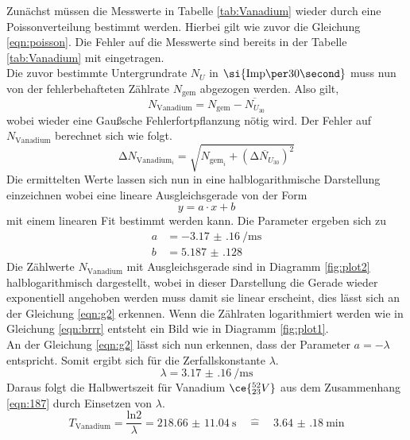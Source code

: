 Zunächst müssen die Messwerte in Tabelle \ref{tab:Vanadium} wieder durch eine Poissonverteilung bestimmt werden.
Hierbei gilt wie zuvor die Gleichung \ref{eqn:poisson}. Die Fehler auf die Messwerte sind bereits in der 
Tabelle \ref{tab:Vanadium} mit eingetragen.
\\
\newline
Die zuvor bestimmte Untergrundrate $N_{U}$ in $\si{{\text{Imp\per}{30}}\second}$ muss nun von der fehlerbehafteten Zählrate
$N_{\text{gem}}$ abgezogen werden. Also gilt,
\begin{equation*}
N_{\text{Vanadium}} = N_{\text{gem}} - \overline{N_{U_{30}}}
\end{equation*}
wobei wieder eine Gaußsche Fehlerfortpflanzung nötig wird. Der Fehler auf $N_{\text{Vanadium}}$ berechnet sich wie folgt.
\begin{equation*}
\increment N_{{\text{Vanadium}_{i}}} = \sqrt{N_{{\text{gem}_{i}}} + (\overline{\increment N_{U_{30}}})^{2} }
\end{equation*}
Die ermittelten Werte lassen sich nun in eine halblogarithmische Darstellung einzeichnen wobei eine lineare Ausgleichsgerade
von der Form
\begin{equation}
\label{eqn:lin}
y = a \cdot x + b
\end{equation}
mit einem linearen Fit bestimmt werden kann. Die Parameter ergeben sich zu
\begin{align}
a &= \SI{-3.17(16)}{\per\milli\second} \\
b &= \SI{5.187(128)}{}
\end{align}
Die Zählwerte $N_{\text{Vanadium}}$ mit Ausgleichsgerade sind in Diagramm \ref{fig:plot2} halblogarithmisch dargestellt, wobei in dieser Darstellung die Gerade wieder exponentiell angehoben werden muss damit sie linear erscheint, dies lässt sich
an der Gleichung \eqref{eqn:g2} erkennen.
Wenn die Zählraten logarithmiert werden wie in Gleichung \eqref{eqn:brrr} entsteht ein Bild wie in Diagramm \ref{fig:plot1}.
\\
\newline
An der Gleichung \eqref{eqn:g2} lässt sich nun erkennen, dass der Parameter $a = -\lambda$ entspricht. Somit ergibt sich für die 
Zerfallskonstante $\lambda$.
\begin{equation}
\lambda = \SI{3.17(16)}{\per\milli\second} 
\end{equation}
Daraus folgt die Halbwertszeit für Vanadium $\ce{^{52}_{23}V}$ aus dem Zusammenhang \eqref{eqn:187} durch Einsetzen von $\lambda$.
\begin{equation}
T_{\text{Vanadium}} = \frac{\text{ln}2}{\lambda} = \SI{218.66(1104)}{\second} \quad  \widehat{=} \quad \SI{3.64(18)}{\minute}
\end{equation}

